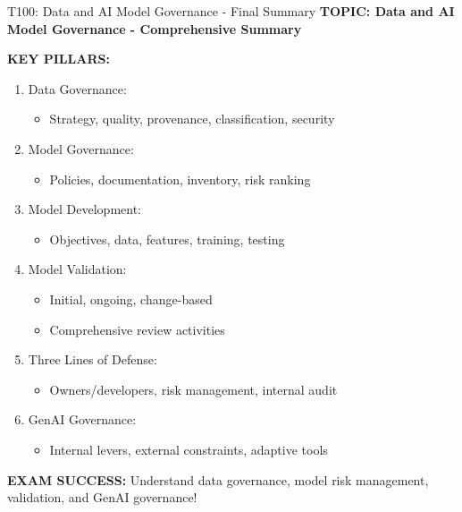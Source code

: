 \documentclass[8pt]{beamer}
\begin{document}
	\begin{frame}{T100: Data and AI Model Governance - Final Summary}
		\fontsize{6.5}{7.5}\selectfont
		\textbf{TOPIC: Data and AI Model Governance - Comprehensive Summary}
		
		\vspace{0.1cm}
		\textbf{KEY PILLARS:}
		\begin{enumerate}
			\item \textcolor{myblue}{Data Governance:}
			\begin{itemize}
				\item Strategy, quality, provenance, classification, security
			\end{itemize}
			\item \textcolor{myblue}{Model Governance:}
			\begin{itemize}
				\item Policies, documentation, inventory, risk ranking
			\end{itemize}
			\item \textcolor{myblue}{Model Development:}
			\begin{itemize}
				\item Objectives, data, features, training, testing
			\end{itemize}
			\item \textcolor{myblue}{Model Validation:}
			\begin{itemize}
				\item Initial, ongoing, change-based
				\item Comprehensive review activities
			\end{itemize}
			\item \textcolor{myblue}{Three Lines of Defense:}
			\begin{itemize}
				\item Owners/developers, risk management, internal audit
			\end{itemize}
			\item \textcolor{myblue}{GenAI Governance:}
			\begin{itemize}
				\item Internal levers, external constraints, adaptive tools
			\end{itemize}
		\end{enumerate}
		
		\textcolor{myred}{\textbf{EXAM SUCCESS:}} Understand \textcolor{myblue}{data governance, model risk management, validation, and GenAI governance}!
	\end{frame}
	
\end{document}
